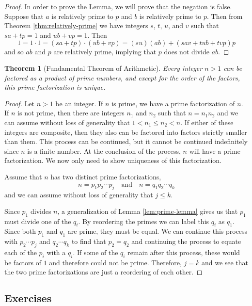 \documentclass[
]{book}
\newtheorem{theorem}{Theorem}[chapter]
\theoremstyle{definition}
\theoremstyle{definition}
\theoremstyle{definition}
\theoremstyle{definition}
\theoremstyle{remark}
\begin{document}
\begin{proof}
In order to prove the Lemma, we will prove that the negation is false. Suppose that \(a\) is relatively prime to \(p\) and \(b\) is relatively prime to \(p\). Then from Theorem \ref{thm:relatively-prime} we have integers \(s\), \(t\), \(u\), and \(v\) such that \(sa+tp=1\) and \(ub+vp=1\). Then
\[1= 1 \cdot 1 = (sa+tp)\cdot (ub+vp) = (su)(ab)+(sav+tub+tvp)p\] and so \(ab\) and \(p\) are relatively prime, implying that \(p\) does not divide \(ab\).
\end{proof}

\begin{theorem}[Fundamental Theorem of Arithmetic]
Every integer \(n>1\) can be factored as a product of prime numbers, and except for the order of the factors, this prime factorization is unique.
\end{theorem}

\begin{proof}
Let \(n>1\) be an integer. If \(n\) is prime, we have a prime factorization of \(n\). If \(n\) is not prime, then there are integers \(n_1\) and \(n_2\) such that \(n=n_1 n_2\) and we can assume without loss of generality that \(1<n_1\leq n_2<n\). If either of these integers are composite, then they also can be factored into factors strictly smaller than them. This process can be continued, but it cannot be continued indefinitely since \(n\) is a finite number. At the conclusion of the process, \(n\) will have a prime factorization. We now only need to show uniqueness of this factorization.

Assume that \(n\) has two distinct prime factorizations,
\[n=p_1 p_2 \cdots p_j \quad \mbox{and} \quad n=q_1 q_2 \cdots q_k\] and we can assume without loss of generality that \(j\leq k\).

Since \(p_1\) divides \(n\), a generalization of Lemma \ref{lem:prime-lemma} gives us that \(p_1\) must divide one of the \(q_i\). By reordering the primes we can label this \(q_i\) as \(q_1\). Since both \(p_1\) and \(q_1\) are prime, they must be equal. We can continue this process with \(p_2 \cdots p_j\) and \(q_2\cdots q_k\) to find that \(p_2=q_2\) and continuing the process to equate each of the \(p_i\) with a \(q_i\). If some of the \(q_i\) remain after this process, these would be factors of \(1\) and therefore could not be prime. Therefore, \(j=k\) and we see that the two prime factorizations are just a reordering of each other.
\end{proof}

\hypertarget{exercises-24}{%
\subsection{Exercises}\label{exercises-24}}
\end{document}
